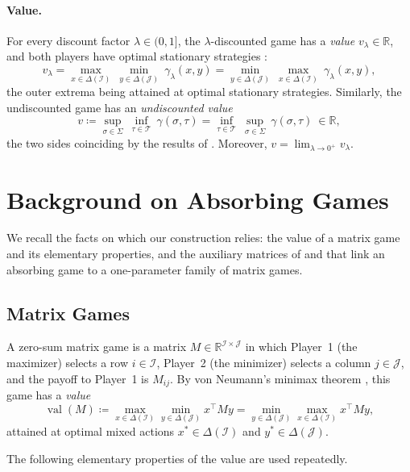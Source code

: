 \documentclass[11pt, a4paper]{article}
\theoremstyle{plain}
\theoremstyle{definition}
\newcommand{\R}{\mathbb{R}}
\DeclareMathOperator{\val}{val}
\newcommand{\defas}{\coloneqq}
\newcommand{\I}{\mathcal{I}}
\newcommand{\J}{\mathcal{J}}
\begin{document}
\paragraph{Value.}
For every discount factor $\lambda\in(0,1]$, the $\lambda$-discounted game has a \emph{value} $v_\lambda\in\R$, and both players have optimal stationary strategies \citep{Sha53}:
\begin{equation}\label{eq:minimax}
v_\lambda=\max_{x\in\Delta(\I)}\ \min_{y\in\Delta(\J)}\ \gamma_\lambda(x,y)
=\min_{y\in\Delta(\J)}\ \max_{x\in\Delta(\I)}\ \gamma_\lambda(x,y),
\end{equation}
the outer extrema being attained at optimal stationary strategies.
Similarly, the undiscounted game has an \emph{undiscounted value}
\begin{equation}\label{eq:limitvalue}
v\defas\sup_{\sigma\in\Sigma}\ \inf_{\tau\in\mathcal T}\ \gamma(\sigma,\tau)
=\inf_{\tau\in\mathcal T}\ \sup_{\sigma\in\Sigma}\ \gamma(\sigma,\tau)\ \in\R,
\end{equation}
the two sides coinciding by the results of \citet{Koh74,MN81}. Moreover, $v=\lim_{\lambda\to0^+}v_\lambda$.

\section{Background on Absorbing Games}\label{sec:background}

We recall the facts on which our construction relies: the value of a matrix game and its elementary properties, and the auxiliary matrices of \citet{AO19} and \citet{OV23} that link an absorbing game to a one-parameter family of matrix games.

\subsection{Matrix Games}

A zero-sum matrix game is a matrix $M\in\R^{\I\times\J}$ in which Player~1 (the maximizer) selects a row $i\in\I$, Player~2 (the minimizer) selects a column $j\in\J$, and the payoff to Player~1 is $M_{ij}$.
By von Neumann's minimax theorem \citep{vN28}, this game has a \emph{value}
\[
\val(M)\defas\max_{x\in\Delta(\I)}\min_{y\in\Delta(\J)}x^{\top}My=\min_{y\in\Delta(\J)}\max_{x\in\Delta(\I)}x^{\top}My,
\]
attained at optimal mixed actions $x^*\in\Delta(\I)$ and $y^*\in\Delta(\J)$.

The following elementary properties of the value are used repeatedly.
\end{document}
